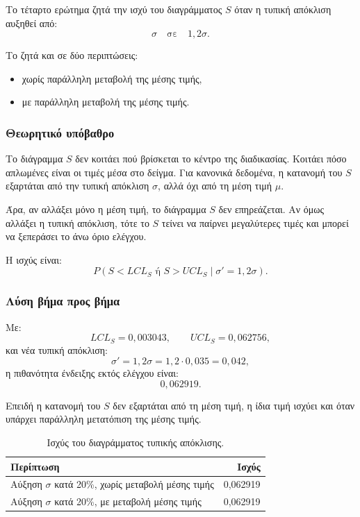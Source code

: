 \documentclass[12pt,a4paper]{article}
\begin{document}
Το τέταρτο ερώτημα ζητά την ισχύ του διαγράμματος \(S\) όταν η τυπική απόκλιση
αυξηθεί από:
\[
    \sigma
    \quad \text{σε} \quad
    1{,}2\sigma.
\]

Το ζητά και σε δύο περιπτώσεις:

\begin{itemize}
    \item χωρίς παράλληλη μεταβολή της μέσης τιμής,
    \item με παράλληλη μεταβολή της μέσης τιμής.
\end{itemize}

\subsubsection*{Θεωρητικό υπόβαθρο}

Το διάγραμμα \(S\) δεν κοιτάει πού βρίσκεται το κέντρο της διαδικασίας. Κοιτάει
πόσο απλωμένες είναι οι τιμές μέσα στο δείγμα. Για κανονικά δεδομένα, η
κατανομή του \(S\) εξαρτάται από την τυπική απόκλιση \(\sigma\), αλλά όχι από
τη μέση τιμή \(\mu\).

Άρα, αν αλλάξει μόνο η μέση τιμή, το διάγραμμα \(S\) δεν επηρεάζεται. Αν όμως
αλλάξει η τυπική απόκλιση, τότε το \(S\) τείνει να παίρνει μεγαλύτερες τιμές
και μπορεί να ξεπεράσει το άνω όριο ελέγχου.

Η ισχύς είναι:
\[
    P(S<LCL_S \text{ ή } S>UCL_S\mid \sigma'=1{,}2\sigma).
\]

\subsubsection*{Λύση βήμα προς βήμα}

Με:
\[
    LCL_S=0{,}003043,\qquad UCL_S=0{,}062756,
\]
και νέα τυπική απόκλιση:
\[
    \sigma'=1{,}2\sigma=1{,}2\cdot 0{,}035=0{,}042,
\]
η πιθανότητα ένδειξης εκτός ελέγχου είναι:
\[
    \boxed{0{,}062919}.
\]

Επειδή η κατανομή του \(S\) δεν εξαρτάται από τη μέση τιμή, η ίδια τιμή ισχύει
και όταν υπάρχει παράλληλη μετατόπιση της μέσης τιμής.

\begin{table}[H]
\centering
\caption{Ισχύς του διαγράμματος τυπικής απόκλισης.}
\begin{tabular}{lr}
\toprule
\textbf{Περίπτωση} & \textbf{Ισχύς} \\
\midrule
Αύξηση \(\sigma\) κατά 20\%, χωρίς μεταβολή μέσης τιμής & 0,062919 \\
Αύξηση \(\sigma\) κατά 20\%, με μεταβολή μέσης τιμής & 0,062919 \\
\bottomrule
\end{tabular}
\end{table}
\end{document}

